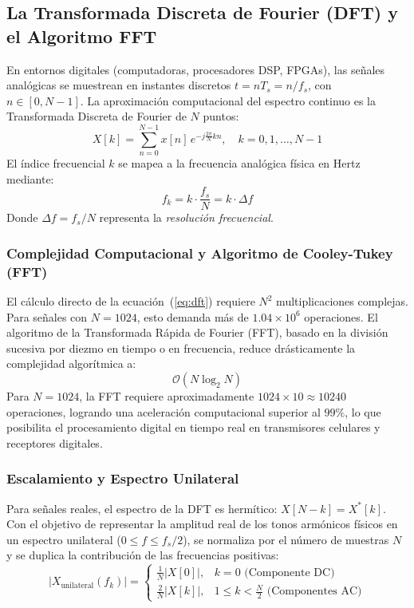\documentclass[11pt,a4paper]{article}
\begin{document}
\subsection{La Transformada Discreta de Fourier (DFT) y el Algoritmo FFT}
En entornos digitales (computadoras, procesadores DSP, FPGAs), las se\~nales anal\'ogicas se muestrean en instantes discretos $t = n T_s = n / f_s$, con $n \in [0, N-1]$. La aproximaci\'on computacional del espectro continuo es la Transformada Discreta de Fourier de $N$ puntos:
\begin{equation}
  X[k] = \sum_{n=0}^{N-1} x[n] \, e^{-j \frac{2\pi}{N} k n}, \quad k = 0, 1, \dots, N-1
  \label{eq:dft}
\end{equation}
El \'indice frecuencial $k$ se mapea a la frecuencia anal\'ogica f\'isica en Hertz mediante:
\begin{equation}
  f_k = k \cdot \frac{f_s}{N} = k \cdot \Delta f
\end{equation}
Donde $\Delta f = f_s / N$ representa la \textit{resoluci\'on frecuencial}.

\subsubsection{Complejidad Computacional y Algoritmo de Cooley-Tukey (FFT)}
El c\'alculo directo de la ecuaci\'on~(\ref{eq:dft}) requiere $N^2$ multiplicaciones complejas. Para se\~nales con $N = 1024$, esto demanda m\'as de $1.04 \times 10^6$ operaciones. El algoritmo de la Transformada R\'apida de Fourier (FFT), basado en la divisi\'on sucesiva por diezmo en tiempo o en frecuencia, reduce dr\'asticamente la complejidad algor\'itmica a:
\begin{equation}
  \mathcal{O}(N \log_2 N)
\end{equation}
Para $N = 1024$, la FFT requiere aproximadamente $1024 \times 10 \approx 10240$ operaciones, logrando una aceleraci\'on computacional superior al $99\%$, lo que posibilita el procesamiento digital en tiempo real en transmisores celulares y receptores digitales.

\subsubsection{Escalamiento y Espectro Unilateral}
Para se\~nales reales, el espectro de la DFT es herm\'itico: $X[N-k] = X^*[k]$. Con el objetivo de representar la amplitud real de los tonos arm\'onicos f\'isicos en un espectro unilateral ($0 \le f \le f_s/2$), se normaliza por el n\'umero de muestras $N$ y se duplica la contribuci\'on de las frecuencias positivas:
\begin{equation}
  |X_{\text{unilateral}}(f_k)| = 
  \begin{cases}
    \frac{1}{N} |X[0]|, & k = 0 \text{ (Componente DC)} \\[0.2cm]
    \frac{2}{N} |X[k]|, & 1 \le k < \frac{N}{2} \text{ (Componentes AC)}
  \end{cases}
\end{equation}
\end{document}
